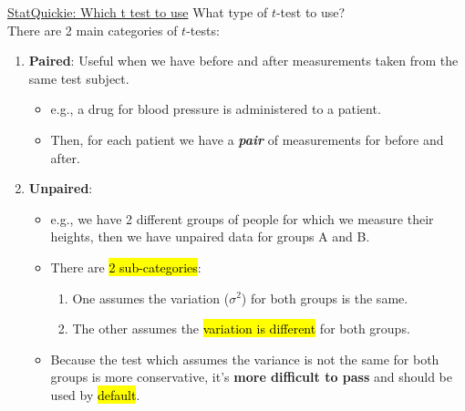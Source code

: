 \documentclass[12pt, titlepage, french]{report}
\begin{document}
\begin{YTB_SUMM_AUTO_NUMB}[label = {SQ-ttest-use}]{\href{https://www.youtube.com/watch?v=nnBJeb_I-q8}{StatQuickie: Which t test to use}}
What type of $t$-test to use?\\
There are 2 main categories of $t$-tests:
\begin{enumerate}
	\item	\textbf{Paired}:	Useful when we have before and after measurements taken from the same test subject.
		\begin{itemize}
		\item	e.g., a drug for blood pressure is administered to a patient.
		\item	Then, for each patient we have a \textit{\textbf{pair}} of measurements for before and after.
		\end{itemize}
	\item	\textbf{Unpaired}: 
		\begin{itemize}
		\item	e.g., we have 2 different groups of people for which we measure their heights, then we have unpaired data for groups A and B.
		\item	There are \hl{2 sub-categories}:
			\begin{enumerate}
			\item	One assumes the variation ($\sigma^{2}$) for both groups is the same.
			\item	The other assumes the \hl{variation is different} for both groups.
			\end{enumerate}
		\item	Because the test which assumes the variance is not the same for both groups is more conservative, it's \textbf{more difficult to pass} and should be used by \hl{default}.
		\end{itemize}
\end{enumerate}

\


\end{YTB_SUMM_AUTO_NUMB}
\end{document}
